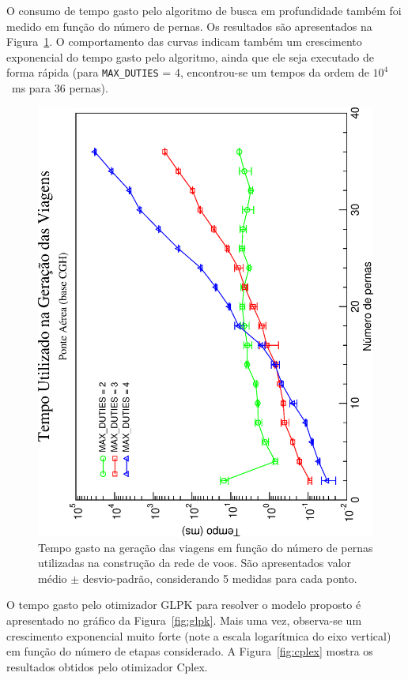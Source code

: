 \documentclass[12pt,a4paper]{article}
\begin{document}
O consumo de tempo gasto pelo algoritmo de busca em profundidade também foi medido em função do 
número de pernas. Os resultados são apresentados na Figura~\ref{fig:generation}. O comportamento das
curvas indicam também um crescimento exponencial do tempo gasto pelo algoritmo, ainda que ele seja
executado de forma rápida (para \verb|MAX_DUTIES| = 4, encontrou-se um tempos da ordem de $10^4$~ms 
para 36 pernas).

\begin{figure}[htb]
	\begin{center}
		\includegraphics[scale=0.45,angle=-90]{fig/generation_time.eps}
		\caption{Tempo gasto na geração das viagens em função do número de pernas utilizadas na 
		construção da rede de voos. São apresentados valor médio $\pm$ desvio-padrão, considerando 5 
		medidas para cada ponto.}
		\label{fig:generation}
	\end{center}
\end{figure}

O tempo gasto pelo otimizador GLPK para resolver o modelo proposto é apresentado no gráfico da 
Figura~\ref{fig:glpk}. Mais uma vez, observa-se um crescimento exponencial muito forte (note a 
escala logarítmica do eixo vertical) em função do número de etapas considerado. A 
Figura~\ref{fig:cplex} mostra os resultados obtidos pelo otimizador Cplex. 
\end{document}
